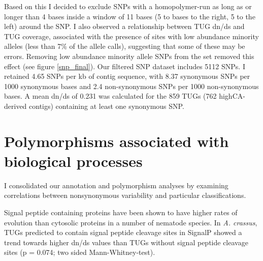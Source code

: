 
Based on this I decided to exclude SNPs with a homopolymer-run as
long as or longer than 4 bases inside a window of 11 bases (5 to bases
to the right, 5 to the left) around the SNP. I also observed a
relationship between TUG dn/ds and TUG coverage, associated with the
presence of sites with low abundance minority alleles (less than 7\%
of the allele calls), suggesting that some of these may be errors.
Removing low abundance minority allele SNPs from the set removed this
effect (see figure \ref{snp_final}).  Our filtered SNP dataset
includes 5112 SNPs. I retained 4.65 SNPs per kb of contig sequence,
with 8.37 synonymous SNPs per 1000 synonymous bases and 2.4
non-synonymous SNPs per 1000 non-synonymous bases. A mean dn/ds of
0.231 was calculated for the 859 TUGs (762 highCA-derived contigs)
containing at least one synonymous SNP.


\section{Polymorphisms associated with biological processes}

I consolidated our annotation and polymorphism analyses by examining
correlations between nonsynonymous variability and particular
classifications.

Signal peptide containing proteins have been shown to have higher
rates of evolution than cytosolic proteins in a number of nematode
species. In \textit{A. crassus}, TUGs predicted to contain signal
peptide cleavage sites in SignalP showed a trend towards higher dn/ds
values than TUGs without signal peptide cleavage sites (p = 0.074; two
sided Mann-Whitney-test).


